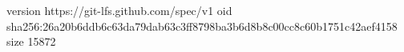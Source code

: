 version https://git-lfs.github.com/spec/v1
oid sha256:26a20b6ddb6c63da79dab63c3ff8798ba3b6d8b8c00cc8c60b1751c42aef4158
size 15872
